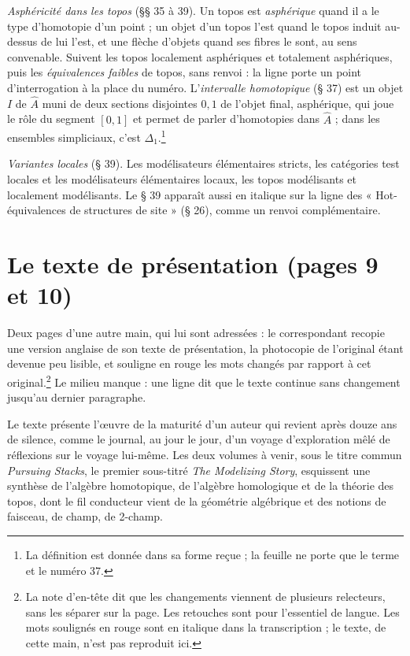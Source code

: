 \documentclass[11pt,a4paper]{article}
\begin{document}
\emph{Asphéricité dans les topos} (§§ 35 à 39). Un topos est
\emph{asphérique} quand il a le type d'homotopie d'un point ; un objet d'un
topos l'est quand le topos induit au-dessus de lui l'est, et une flèche d'objets
quand ses fibres le sont, au sens convenable. Suivent les topos localement
asphériques et totalement asphériques, puis les \emph{équivalences faibles}
de topos, sans renvoi : la ligne porte un point d'interrogation à la place du
numéro. L'\emph{intervalle homotopique} (§ 37) est un objet $I$ de
$\widehat{A}$ muni de deux sections disjointes $0, 1$ de l'objet final,
asphérique, qui joue le rôle du segment $[0,1]$ et permet de parler
d'homotopies dans $\widehat{A}$ ; dans les ensembles simpliciaux,
c'est $\Delta_{1}$.\footnote{La définition est donnée dans sa forme reçue ;
la feuille ne porte que le terme et le numéro 37.}

\emph{Variantes locales} (§ 39). Les modélisateurs élémentaires stricts, les
catégories test locales et les modélisateurs élémentaires locaux, les topos
modélisants et localement modélisants. Le § 39 apparaît aussi en italique
sur la ligne des « Hot-équivalences de structures de site » (§ 26), comme un
renvoi complémentaire.

\section*{Le texte de présentation (pages 9 et 10)}

Deux pages d'une autre main, qui lui sont adressées : le correspondant
recopie une version anglaise de son texte de présentation, la photocopie de
l'original étant devenue peu lisible, et souligne en rouge les mots changés
par rapport à cet original.\footnote{La note d'en-tête dit que les changements
viennent de plusieurs relecteurs, sans les séparer sur la page. Les
retouches sont pour l'essentiel de langue. Les mots soulignés en rouge sont en
italique dans la transcription ; le texte, de cette main, n'est pas reproduit
ici.} Le milieu manque : une ligne dit que le texte continue sans changement
jusqu'au dernier paragraphe.

Le texte présente l'œuvre de la maturité d'un auteur qui revient après douze
ans de silence, comme le journal, au jour le jour, d'un voyage d'exploration
mêlé de réflexions sur le voyage lui-même. Les deux volumes à venir, sous le
titre commun \emph{Pursuing Stacks}, le premier sous-titré \emph{The
Modelizing Story}, esquissent une synthèse de l'algèbre homotopique, de
l'algèbre homologique et de la théorie des topos, dont le fil conducteur vient
de la géométrie algébrique et des notions de faisceau, de champ, de 2-champ.
\end{document}

